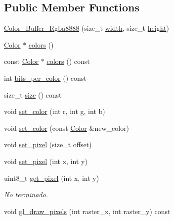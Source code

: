 \subsection*{Public Member Functions}
\begin{DoxyCompactItemize}
\item 
\mbox{\hyperlink{classoglsl_1_1_color___buffer___rgba8888_ac56d38470b2ad20f4ec6d91f92c5b5dd}{Color\+\_\+\+Buffer\+\_\+\+Rgba8888}} (size\+\_\+t \mbox{\hyperlink{classoglsl_1_1_color___buffer_a520198eca2cfb64729d134d12efae304}{width}}, size\+\_\+t \mbox{\hyperlink{classoglsl_1_1_color___buffer_a18db6640d6dec54b6695821b9dcaf9c5}{height}})
\item 
\mbox{\hyperlink{structoglsl_1_1_color___buffer___rgba8888_1_1_color}{Color}} $\ast$ \mbox{\hyperlink{classoglsl_1_1_color___buffer___rgba8888_aa05a3ac094c6af59f348dff1e44d9db3}{colors}} ()
\item 
const \mbox{\hyperlink{structoglsl_1_1_color___buffer___rgba8888_1_1_color}{Color}} $\ast$ \mbox{\hyperlink{classoglsl_1_1_color___buffer___rgba8888_a7261b709b3a0ffe196fe14df5311ba76}{colors}} () const
\item 
int \mbox{\hyperlink{classoglsl_1_1_color___buffer___rgba8888_a3b4da4899c6765e8689ec2b438ecba84}{bits\+\_\+per\+\_\+color}} () const
\item 
size\+\_\+t \mbox{\hyperlink{classoglsl_1_1_color___buffer___rgba8888_a6017d41ebb2a8d35c68e5e2c9efb4c3c}{size}} () const
\item 
void \mbox{\hyperlink{classoglsl_1_1_color___buffer___rgba8888_a5860a8570962cd69e864e2dc43884373}{set\+\_\+color}} (int r, int g, int b)
\item 
void \mbox{\hyperlink{classoglsl_1_1_color___buffer___rgba8888_a54ea503bd5d38f1b669c33d55f47f80e}{set\+\_\+color}} (const \mbox{\hyperlink{structoglsl_1_1_color___buffer___rgba8888_1_1_color}{Color}} \&new\+\_\+color)
\item 
void \mbox{\hyperlink{classoglsl_1_1_color___buffer___rgba8888_a9a62b5f6084af1d6fd1fc7b075c6e025}{set\+\_\+pixel}} (size\+\_\+t offset)
\item 
void \mbox{\hyperlink{classoglsl_1_1_color___buffer___rgba8888_a88a98459049a2366ef58a08a1716b9f9}{set\+\_\+pixel}} (int x, int y)
\item 
uint8\+\_\+t \mbox{\hyperlink{classoglsl_1_1_color___buffer___rgba8888_a0b329444747708cd48509acd56886499}{get\+\_\+pixel}} (int x, int y)
\begin{DoxyCompactList}\small\item\em No terminado. \end{DoxyCompactList}\item 
void \mbox{\hyperlink{classoglsl_1_1_color___buffer___rgba8888_a06d2384e10162f928e59bfa6e23046da}{gl\+\_\+draw\+\_\+pixels}} (int raster\+\_\+x, int raster\+\_\+y) const
\end{DoxyCompactItemize}
